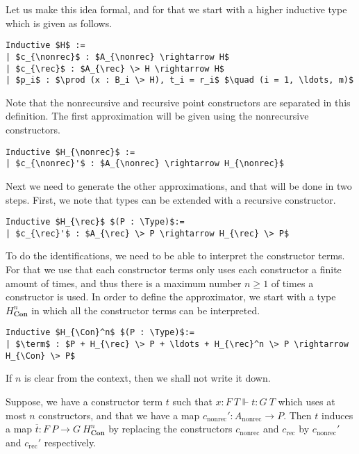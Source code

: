 \documentclass[a4paper,UKenglish]{lipics-v2016}
\newcommand{\rec}[0]{\operatorname{rec}}
\newcommand{\nonrec}[0]{\operatorname{nonrec}}
\newcommand{\term}[0]{\textbf{term}}
\newcommand{\Con}[0]{\textbf{Con}}
\newcommand{\Type}[0]{\operatorname{\textsc{Type}}}
\begin{document}
Let us make this idea formal, and for that we start with a higher inductive type which is given as follows.
\lstset{language=Coq}
\begin{lstlisting}[label={lst:HIT}]
Inductive $H$ :=
| $c_{\nonrec}$ : $A_{\nonrec} \rightarrow H$
| $c_{\rec}$ : $A_{\rec} \> H \rightarrow H$
| $p_i$ : $\prod (x : B_i \> H), t_i = r_i$ $\quad (i = 1, \ldots, m)$
\end{lstlisting}
Note that the nonrecursive and recursive point constructors are separated in this definition.
The first approximation will be given using the nonrecursive constructors.
\lstset{language=Coq}
\begin{lstlisting}
Inductive $H_{\nonrec}$ :=
| $c_{\nonrec}'$ : $A_{\nonrec} \rightarrow H_{\nonrec}$
\end{lstlisting}

Next we need to generate the other approximations, and that will be done in two steps.
First, we note that types can be extended with a recursive constructor.
\lstset{language=Coq}
\begin{lstlisting}
Inductive $H_{\rec}$ $(P : \Type)$:=
| $c_{\rec}'$ : $A_{\rec} \> P \rightarrow H_{\rec} \> P$
\end{lstlisting}
To do the identifications, we need to be able to interpret the constructor terms.
For that we use that each constructor terms only uses each constructor  a finite amount of times, and thus there is a maximum number $n \geq 1$ of times a constructor is used.
In order to define the approximator, we start with a type $H_{\Con}^n$ in which all the constructor terms can be interpreted.
\lstset{language=Coq}
\begin{lstlisting}
Inductive $H_{\Con}^n$ $(P : \Type)$:=
| $\term$ : $P + H_{\rec} \> P + \ldots + H_{\rec}^n \> P \rightarrow H_{\Con} \> P$
\end{lstlisting}

If $n$ is clear from the context, then we shall not write it down.

\begin{lemma}
Suppose, we have a constructor term $t$ such that $x : F \> T \Vdash t : G \>T$ which uses at most $n$ constructors, and that we have a map $c_{\nonrec}' : A_{\nonrec} \rightarrow P$.
Then $t$ induces a map $\overline{t} : F \> P \rightarrow G \> H_{\Con}^n$ by replacing the constructors $c_{\nonrec}$ and $c_{\rec}$ by $c_{\nonrec}'$ and $c_{\rec}'$ respectively.
\end{lemma}
\end{document}
